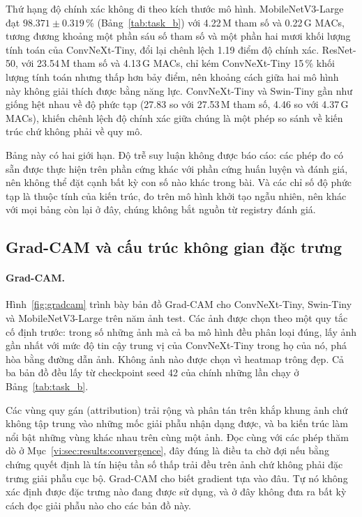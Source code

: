 

Thứ hạng độ chính xác không đi theo kích thước mô hình. MobileNetV3-Large đạt
$98.371 \pm 0.319$\,\% (Bảng~\ref{tab:task_b}) với 4.22\,M tham số và
0.22\,G MACs, tương đương khoảng một phần sáu số tham số và một phần hai mươi khối
lượng tính toán của ConvNeXt-Tiny, đổi lại chênh lệch 1.19 điểm độ chính xác.
ResNet-50, với 23.54\,M tham số và 4.13\,G MACs, chỉ kém ConvNeXt-Tiny 15\,\%
khối lượng tính toán nhưng thấp hơn bảy điểm, nên khoảng cách giữa hai mô hình
này không giải thích được bằng năng lực. ConvNeXt-Tiny và Swin-Tiny gần như
giống hệt nhau về độ phức tạp (27.83 so với 27.53\,M tham số, 4.46 so với
4.37\,G MACs), khiến chênh lệch độ chính xác giữa chúng là một phép so sánh về
kiến trúc chứ không phải về quy mô.

Bảng này có hai giới hạn. Độ trễ suy luận không được báo cáo: các phép đo có
sẵn được thực hiện trên phần cứng khác với phần cứng huấn luyện và đánh giá,
nên không thể đặt cạnh bất kỳ con số nào khác trong bài. Và các chỉ số độ phức
tạp là thuộc tính của kiến trúc, đo trên mô hình khởi tạo ngẫu nhiên, nên khác
với mọi bảng còn lại ở đây, chúng không bắt nguồn từ registry đánh giá.

\subsection{Grad-CAM và cấu trúc không gian đặc trưng}
\label{vi:sec:results:gradcam}

\paragraph{Grad-CAM.} Hình~\ref{fig:gradcam} trình bày bản đồ Grad-CAM cho
ConvNeXt-Tiny, Swin-Tiny và MobileNetV3-Large trên năm ảnh test. Các ảnh được
chọn theo một quy tắc cố định trước: trong số những ảnh mà cả ba mô hình đều
phân loại đúng, lấy ảnh gần nhất với mức độ tin cậy trung vị của ConvNeXt-Tiny
trong họ của nó, phá hòa bằng đường dẫn ảnh. Không ảnh nào được chọn vì
heatmap trông đẹp. Cả ba bản đồ đều lấy từ checkpoint seed 42 của chính những
lần chạy ở Bảng~\ref{tab:task_b}.



Các vùng quy gán (attribution) trải rộng và phân tán trên khắp khung ảnh chứ
không tập trung vào những mốc giải phẫu nhận dạng được, và ba kiến trúc làm
nổi bật những vùng khác nhau trên cùng một ảnh. Đọc cùng với các phép thăm dò
ở Mục~\ref{vi:sec:results:convergence}, đây đúng là điều ta chờ đợi nếu bằng
chứng quyết định là tín hiệu tần số thấp trải đều trên ảnh chứ không phải đặc
trưng giải phẫu cục bộ. Grad-CAM cho biết gradient tựa vào đâu. Tự nó không xác
định được đặc trưng nào đang được sử dụng, và ở đây không đưa ra bất kỳ
cách đọc giải phẫu nào cho các bản đồ này.


